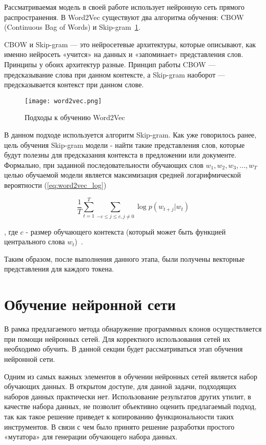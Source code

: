 Рассматриваемая модель в своей работе использует нейронную сеть прямого распространения. В Word2Vec существуют два алгоритма обучения: CBOW (Continuous Bag of Words) и Skip-gram~\ref{fig:word2vec}.


CBOW и Skip-gram — это нейросетевые архитектуры, которые описывают, как именно нейросеть «учится» на данных и «запоминает» представления слов. Принципы у обоих архитектур разные. Принцип работы CBOW — предсказывание слова при данном контексте, а Skip-gram наоборот — предсказывается контекст при данном слове.

\begin{figure}[htbp]
\centering
\texttt{[image: word2vec.png]}
\caption{Подходы к обучению Word2Vec}
\label{fig:word2vec}
\end{figure}

В данном подходе используется алгоритм Skip-gram. Как уже говорилось ранее, цель обучения Skip-gram модели - найти такие представления слов, которые будут полезны для предсказания контекста в предложении или документе. Формально, при заданной последовательности обучающих слов \(w_1, w_2, w_3,...,w_T\) целью обучаемой модели является максимизация средней логарифмической вероятности (\ref{eq:word2vec_log})

\begin{equation}
\label{eq:word2vec_log}
\frac{1}{T}\sum_{t=1}^{T}\sum_{-c \leq j \leq c,j\neq0}\log p(w_{t+j}|w_t)
\end{equation}

, где \(c\) - размер обучающего контекста (который может быть функцией центрального слова \(w_t\))~\cite{word2vec}.

Таким образом, после выполнения данного этапа, были получены векторные представления для каждого токена.
\section{Обучение нейронной сети}

В рамка предлагаемого метода обнаружение программных клонов осуществляется при помощи нейронных сетей. Для корректного использования сетей их необходимо обучить. В данной секции будет рассматриваться этап обучения нейронной сети.

Одним из самых важных элементов в обучении нейронных сетей является набор обучающих данных. В открытом доступе, для данной задачи, подходящих наборов данных практически нет. Использование результатов других утилит, в качестве набора данных, не позволит объективно оценить предлагаемый подход, так как такое решение приведет к копированию функциональности таких инструментов. В связи с чем было принято решение разработки простого «мутатора» для генерации обучающего набора данных.


